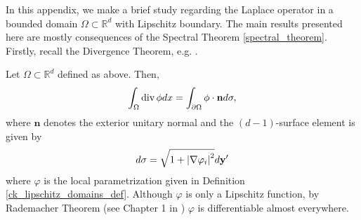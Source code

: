 

In this appendix, we make a brief study regarding the Laplace operator in a bounded domain \(\Omega \subset \mathbb{R}^d\) with Lipschitz boundary. The main results presented here are mostly consequences of the Spectral Theorem \ref{spectral_theorem}. Firstly, recall the Divergence Theorem, e.g. \cite{evans2015measure}.

\begin{theorem}\label{appendix_div_theor}
    Let \(\Omega \subset \mathbb{R}^d\) defined as above. Then,
    \[
      \int_\Omega \operatorname{div} \phi dx = \int_{\partial\Omega} \phi \cdot \mathbf{n} d\sigma,
    \]
    where \(\mathbf{n}\) denotes the exterior unitary normal and the \((d-1)\)-surface element is given by
    \[
        d\sigma = \sqrt{1+ \abs{\nabla \varphi_i}^2} d \mathbf{y}'
    \]
    where \(\varphi\) is the local parametrization given in Definition \ref{ck_lipschitz_domains_def}. Although \(\varphi\) is only a Lipschitz function, by Rademacher Theorem (see Chapter 1 in \cite{salsa2016partial}) \(\varphi\) is differentiable almost everywhere.
\end{theorem}

